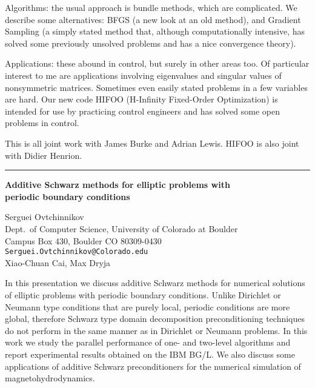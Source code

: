 \documentclass[twosided]{report}
\begin{document}
Algorithms: the usual approach is bundle methods, which are
complicated. We describe some alternatives: BFGS (a new look
at an old method), and Gradient Sampling (a simply stated
method that, although computationally intensive, has solved
some previously unsolved problems and has a nice convergence
theory).

 Applications: these abound in control, but
surely in other areas too. Of particular interest to me are
applications involving eigenvalues and singular values of
nonsymmetric matrices. Sometimes even easily stated problems
in a few variables are hard. Our new code HIFOO (H-Infinity
Fixed-Order Optimization) is intended for use by practicing
control engineers and has solved some open problems in
control.

 This is all joint work with James Burke and
Adrian Lewis. HIFOO is also joint with Didier Henrion.



	\begin{center} \rule{6in}{1pt} \end{center}

\begin{center}
{\large			%
{\bf Additive Schwarz methods for elliptic problems with \\
	periodic boundary conditions}}

	Serguei Ovtchinnikov \\
	Dept.~of Computer Science, University of Colorado at
	Boulder \\ Campus Box 430, Boulder CO 80309-0430 \\
	{\tt Serguei.Ovtchinnikov@Colorado.edu} \\
	Xiao-Chuan Cai, Max Dryja
\end{center}
In this presentation we discuss additive Schwarz methods for
numerical solutions of elliptic problems with periodic
boundary conditions. Unlike Dirichlet or Neumann type
conditions that are purely local, periodic conditions are
more global, therefore Schwarz type domain decomposition
preconditioning techniques do not perform in the same manner
as in Dirichlet or Neumann problems. In this work we study
the parallel performance of one- and two-level algorithms
and report experimental results obtained on the IBM BG/L.
We also discuss some applications of additive Schwarz
preconditioners for the numerical simulation of
magnetohydrodynamics.
\end{document}
